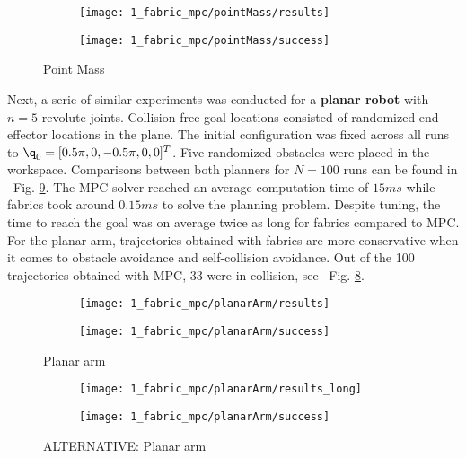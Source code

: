 \begin{figure}[h]
  \centering
  \begin{subfigure}{0.7\linewidth}
    \centering
    \texttt{[image: 1\_fabric\_mpc/pointMass/results]}
    \caption{}
    \label{subfig:experiment1_pointMass_res}
  \end{subfigure}%
  \begin{subfigure}{0.3\linewidth}
    \centering
    \texttt{[image: 1\_fabric\_mpc/pointMass/success]}
    \caption{}
    \label{subfig:experiment1_pointMass_success}
  \end{subfigure}
  \caption{Point Mass}%
  \label{fig:experiment1_pointMass}
\end{figure}

Next, a serie of similar experiments was conducted for a \textbf{planar robot} with $n=5$
revolute joints. Collision-free goal locations consisted of randomized end-effector
locations in the plane. The initial configuration was fixed across all runs to $\q_0 =
[0.5\pi, 0, -0.5\pi, 0, 0]^T$. Five randomized obstacles were placed in the workspace.
Comparisons between both planners for $N=100$ runs can be found in ~{Fig.
\ref{fig:experiment1_planarArm}}. The MPC solver reached an average computation time of
$15ms$ while fabrics took around $0.15ms$ to solve the planning problem. Despite tuning,
the time to reach the goal was on average twice as long for fabrics compared to MPC. 
For the planar arm, trajectories obtained with fabrics are more conservative when it comes
to obstacle avoidance and self-collision avoidance. Out of the 100 trajectories obtained
with MPC, 33 were in collision, see ~{Fig. \ref{subfig:experiment1_planarArm_success}}.

\begin{figure}[h]
  \centering
  \begin{subfigure}{0.7\linewidth}
    \centering
    \texttt{[image: 1\_fabric\_mpc/planarArm/results]}
    \caption{}
    \label{subfig:experiment1_planarArm_res}
  \end{subfigure}%
  \begin{subfigure}{0.3\linewidth}
    \centering
    \texttt{[image: 1\_fabric\_mpc/planarArm/success]}
    \caption{}
    \label{subfig:experiment1_planarArm_success}
  \end{subfigure}
  \caption{Planar arm}%
  \label{fig:experiment1_planarArm}
\end{figure}

\begin{figure}[h]
  \centering
  \begin{subfigure}{0.7\linewidth}
    \centering
    \texttt{[image: 1\_fabric\_mpc/planarArm/results\_long]}
    \caption{}
    \label{subfig:experiment1_planarArm_res}
  \end{subfigure}%
  \begin{subfigure}{0.3\linewidth}
    \centering
    \texttt{[image: 1\_fabric\_mpc/planarArm/success]}
    \caption{}
    \label{subfig:experiment1_planarArm_success}
  \end{subfigure}
  \caption{ALTERNATIVE: Planar arm}%
  \label{fig:experiment1_planarArm}
\end{figure}




